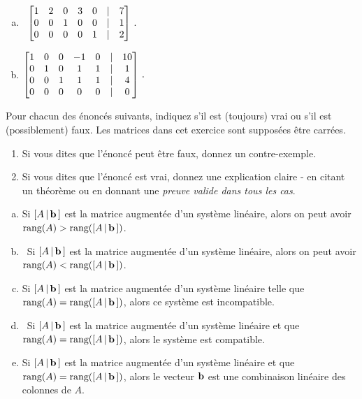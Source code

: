 \begin{prob}
\begin{enumerate}[a)]
\item\sov~$\bmatrix  1 & 2 & 0 & 3 & 0 &|& 7 \\
 0 & 0 & 1 & 0 & 0 &|& 1 \\
 0 & 0 & 0 & 0 & 1 &|& 2 \endbmatrix\,.$
\medskip
 

\item $ \bmatrix 
1& 0& 0& -1& 0&|& 10\\  
0& 1& 0& 1&1&|& 1\\ 
0& 0& 1& 1& 1&|& 4\\ 
0& 0& 0& 0& 0&|& 0\endbmatrix\,.$
\medskip
 
\end{enumerate}

\end{prob} 

 \begin{prob} \label{prob14.7} Pour chacun des énoncés suivants, indiquez s'il est (toujours) vrai ou s'il est (possiblement) faux.     Les matrices dans cet exercice sont supposées être carrées.  
   \smallskip    
\begin{enumerate}[$\bullet$]
\item Si vous dites que l'\'enonc\'e peut être faux, donnez un contre-exemple.   
\item Si vous dites que l'\'enonc\'e est vrai, donnez une explication claire - en citant un théorème ou en donnant une {\it preuve valide dans tous les cas}. 
\end{enumerate}
\medskip
\begin{enumerate}[a)]
\item Si $[A\,|\,\mathbf{b}\,]$ est la matrice augmentée d'un système linéaire, alors on peut avoir $\textrm{rang} (A) > \textrm{rang} ([A\,|\,\mathbf{b}\,])$.
\medskip
 
\item\sov~Si $[A\,|\,\mathbf{b}\,]$ est la matrice augmentée d'un système linéaire, alors on peut avoir $\textrm{rang} (A)<\textrm{rang}( [A\,|\,\mathbf{b}\,])$.
\medskip
 

\item Si $[A\,|\,\mathbf{b}\,]$ est la matrice augmentée d'un système linéaire telle que $\textrm{rang}(A)=\textrm{rang} ([A\,|\,\mathbf{b}\,])$, alors ce système est incompatible.\medskip

 
\item\sov~Si $[A\,|\,\mathbf{b}\,]$ est la matrice augmentée d'un système linéaire et que  $\textrm{rang}(A)=\textrm{rang} ([A\,|\,\mathbf{b}\,])$, alors le système est compatible. 
 
 
\medskip
\item Si $[A\,|\,\mathbf{b}\,]$ est la matrice augmentée d'un système linéaire et que $\textrm{rang}(A)=\textrm{rang} ([A\,|\,\mathbf{b}\,])$, alors le vecteur $\mathbf{b}$ est une combinaison linéaire des colonnes de $A$. 
\medskip
 

\end{enumerate}
\end{prob}
